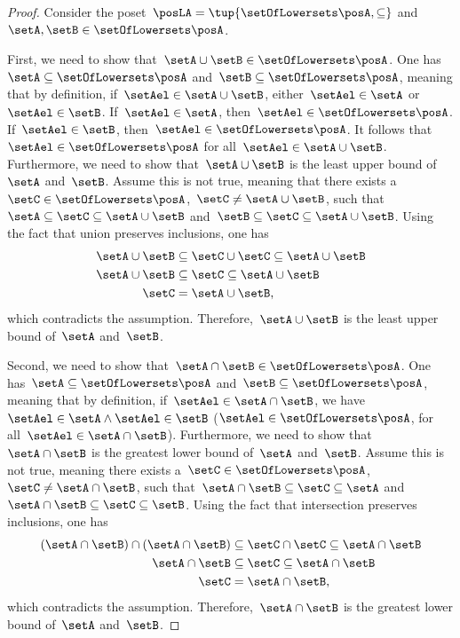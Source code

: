 \begin{proof}
	Consider the poset~$\posLA=\tup{\setOfLowersets \posA,\subseteq}$ and~$\setA,\setB\in \setOfLowersets \posA$.

	First, we need to show that~$\setA\cup \setB\in \setOfLowersets \posA$.
	One has~$\setA \subseteq \setOfLowersets \posA$ and~$\setB\subseteq \setOfLowersets \posA$, meaning that by definition, if~$\setAel\in \setA\cup \setB$, either~$\setAel\in \setA$ or~$\setAel\in \setB$.
	If~$\setAel\in \setA$, then~$\setAel\in \setOfLowersets \posA$.
	If~$\setAel\in \setB$, then~$\setAel\in \setOfLowersets \posA$.
	It follows that~$\setAel\in \setOfLowersets \posA$ for all~$\setAel\in \setA\cup \setB$.
	Furthermore, we need to show that~$\setA\cup \setB$ is the least upper bound of~$\setA$ and~$\setB$.
	Assume this is not true, meaning that there exists a~$\setC\in \setOfLowersets \posA$,~$\setC\neq \setA\cup \setB$, such that~$\setA\subseteq \setC\subseteq \setA\cup \setB$ and~$\setB\subseteq \setC\subseteq \setA\cup \setB$.
	Using the fact that union preserves inclusions, one has
	\begin{equation}
		\begin{aligned}
			\setA\cup \setB & \subseteq \setC\cup \setC \subseteq \setA\cup \setB \\
			\setA\cup \setB & \subseteq \setC \subseteq \setA\cup \setB           \\
			\setC           & = \setA\cup \setB,
		\end{aligned}
	\end{equation}
	which contradicts the assumption.
	Therefore,~$\setA\cup \setB$ is the least upper bound of~$\setA$ and~$\setB$.

	Second, we need to show that~$\setA\cap \setB\in \setOfLowersets \posA$.
	One has~$\setA\subseteq \setOfLowersets \posA$ and~$\setB\subseteq \setOfLowersets \posA$, meaning that by definition, if~$\setAel\in \setA\cap \setB$, we have~$\setAel \in \setA\wedge \setAel\in \setB$ ($\setAel\in \setOfLowersets \posA$, for all~$\setAel\in \setA\cap \setB$).
	Furthermore, we need to show that~$\setA\cap \setB$ is the greatest lower bound of~$\setA$ and~$\setB$.
	Assume this is not true, meaning there exists a~$\setC\in \setOfLowersets \posA$,~$\setC\neq \setA\cap \setB$, such that~$\setA\cap \setB\subseteq \setC\subseteq \setA$ and~$\setA\cap \setB\subseteq \setC\subseteq \setB$.
	Using the fact that intersection preserves inclusions, one has
	\begin{equation}
		\begin{aligned}
			(\setA\cap \setB)
			\cap (\setA\cap \setB) & \subseteq \setC \cap \setC \subseteq \setA\cap \setB \\
			\setA\cap \setB        & \subseteq \setC\subseteq \setA\cap \setB             \\
			\setC                  & =\setA\cap \setB,
		\end{aligned}
	\end{equation}
	which contradicts the assumption.
	Therefore,~$\setA\cap \setB$ is the greatest lower bound of~$\setA$ and~$\setB$.


\end{proof}
